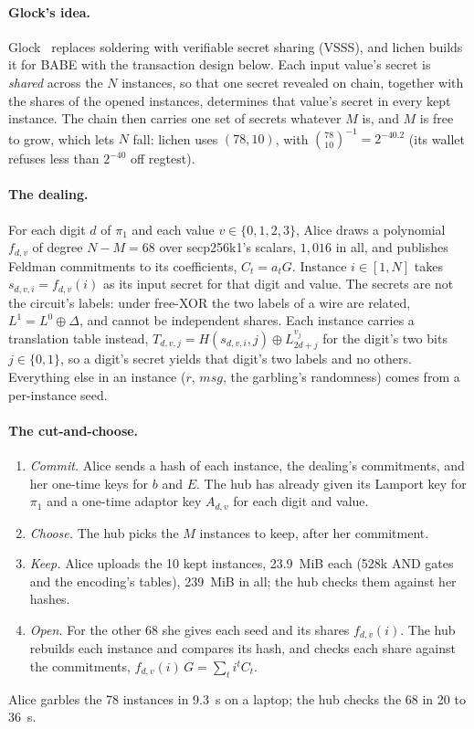\documentclass[11pt]{article}
\begin{document}
\paragraph{Glock's idea.} Glock~\cite{glock} replaces soldering with
verifiable secret sharing (VSSS), and lichen builds it for BABE with the
transaction design below. Each input value's secret is \emph{shared}
across the $N$ instances, so that one secret revealed on chain, together
with the shares of the opened instances, determines that value's
secret in every kept instance. The chain then carries one set of secrets
whatever $M$ is, and $M$ is free to grow, which lets $N$ fall: lichen
uses $(78, 10)$, with $\binom{78}{10}^{-1} = 2^{-40.2}$ (its wallet
refuses less than $2^{-40}$ off regtest).

\paragraph{The dealing.} For each digit $d$ of $\pi_1$ and each value $v
\in \{0,1,2,3\}$, Alice draws a polynomial $f_{d,v}$ of degree $N - M =
68$ over secp256k1's scalars, $1{,}016$ in all, and publishes Feldman
commitments to its coefficients, $C_t = a_t G$. Instance $i \in [1, N]$
takes $s_{d,v,i} = f_{d,v}(i)$ as its input secret for that digit and
value. The secrets are not the circuit's labels: under free-XOR the two
labels of a wire are related, $L^1 = L^0 \oplus \Delta$, and cannot be
independent shares. Each instance carries a translation table instead,
$T_{d,v,j} = H(s_{d,v,i}, j) \oplus L^{v_j}_{2d+j}$ for the digit's two
bits $j \in \{0, 1\}$, so a digit's secret yields that digit's two
labels and no others. Everything else in an instance ($r$,
$\mathit{msg}$, the garbling's randomness) comes from a per-instance
seed.

\paragraph{The cut-and-choose.}
\begin{enumerate}[leftmargin=1.5em]
\item \emph{Commit.} Alice sends a hash of each instance, the dealing's
  commitments, and her one-time keys for $b$ and $E$. The hub has
  already given its Lamport key for $\pi_1$ and a one-time adaptor key
  $A_{d,v}$ for each digit and value.
\item \emph{Choose.} The hub picks the $M$ instances to keep, after her
  commitment.
\item \emph{Keep.} Alice uploads the 10 kept instances, 23.9~MiB each
  (528k AND gates and the encoding's tables), 239~MiB in all; the hub
  checks them against her hashes.
\item \emph{Open.} For the other 68 she gives each seed and its shares
  $f_{d,v}(i)$. The hub rebuilds each instance and compares its hash,
  and checks each share against the commitments, $f_{d,v}(i)\,G =
  \sum_t i^t C_t$.
\end{enumerate}
Alice garbles the 78 instances in 9.3~s on a laptop; the hub checks the
68 in 20 to 36~s.
\end{document}
